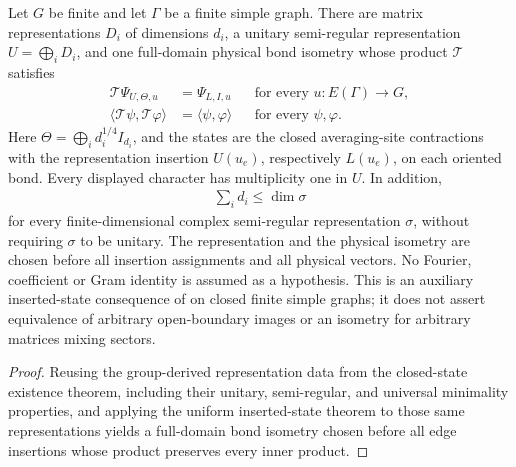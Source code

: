 \begin{lemma}
    \label{thm:peps_graph_inserted_semiregular_factory}
    \leanok
    Let $G$ be finite and let $\Gamma$ be a finite simple graph. There are
    matrix representations $D_i$ of dimensions $d_i$, a unitary
    semi-regular representation $U=\bigoplus_i D_i$, and one full-domain
    physical bond isometry whose product $\mathcal T$ satisfies
    \begin{align}
        \mathcal T\Psi_{U,\Theta,u} & =\Psi_{L,I,u}
                                    &                             & \text{for every }u:E(\Gamma)\to G, \\
        \langle\mathcal T\psi,\mathcal T\varphi\rangle
                                    & =\langle\psi,\varphi\rangle
                                    &                             & \text{for every }\psi,\varphi.
    \end{align}
    Here $\Theta=\bigoplus_i d_i^{1/4}I_{d_i}$, and the states are the
    closed averaging-site contractions with the representation
    insertion $U(u_e)$, respectively $L(u_e)$, on each oriented bond.
    Every displayed character has multiplicity one in $U$. In addition,
    \begin{align}
        \sum_i d_i\leq\dim\sigma
    \end{align}
    for every finite-dimensional complex semi-regular representation
    $\sigma$, without requiring $\sigma$ to be unitary.
    The representation and the physical isometry are chosen before all
    insertion assignments and all physical vectors. No Fourier,
    coefficient or Gram identity is assumed as a hypothesis.
    This is an auxiliary inserted-state consequence of
    \cite[Section~7]{Schuch2010PEPS} on closed finite simple graphs;
    it does not assert equivalence of arbitrary open-boundary images
    or an isometry for arbitrary matrices mixing sectors.
\end{lemma}

\begin{proof}\leanok
    Reusing the group-derived representation data from the closed-state
    existence theorem, including their unitary, semi-regular, and universal
    minimality properties, and applying the uniform inserted-state theorem to
    those same representations yields a full-domain bond isometry chosen before
    all edge insertions whose product preserves every inner product.
\end{proof}
